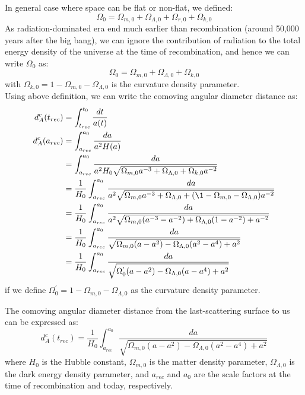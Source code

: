 \bigskip \noindent
\begin{foundation}
    In general case where space can be flat or non-flat, we defined:
    \[
        \Omega_0 = \Omega_{m,0} + \Omega_{\Lambda,0} + \Omega_{r,0} + \Omega_{k,0}
    \]
    As radiation-dominated era end much earlier than recombination (around 50,000 years after the big bang), we can ignore the contribution of radiation to the total energy density of the universe at the time of recombination, and hence we can write $\Omega_0$ as:
    \[
        \Omega_0 = \Omega_{m,0} + \Omega_{\Lambda,0} + \Omega_{k,0}
    \]
    with $\Omega_{k,0} = 1 - \Omega_{m,0} - \Omega_{\Lambda,0}$ is the curvature density parameter. \\

    Using above definition, we can write the comoving angular diameter distance as:
    \begin{align*}
        d_A^c(t_{rec}) &= \int_{t_{rec}}^{t_0} \frac{dt}{a(t)} \\
        d_A^c(a_{rec}) &= \int_{a_{rec}}^{a_0} \frac{da}{a^2 H(a)} \\
         &= \int_{a_{rec}}^{a_0} \frac{da}{a^2 H_0 \sqrt{\Omega_{m,0} a^{-3} + \Omega_{\Lambda,0} + \Omega_{k,0} a^{-2}}} \\
         &= \frac{1}{H_0} \int_{a_{rec}}^{a_0} \frac{da}{a^2 \sqrt{\Omega_{m,0} a^{-3} + \Omega_{\Lambda,0} + (\1 - \Omega_{m,0} - \Omega_{\Lambda,0}) a^{-2}}} \\
         &= \frac{1}{H_0} \int_{a_{rec}}^{a_0} \frac{da}{a^2 \sqrt{\Omega_{m,0} (a^{-3} - a^{-2}) + \Omega_{\Lambda,0} (1 - a^{-2}) + a^{-2}}} \\
         &= \frac{1}{H_0} \int_{a_{rec}}^{a_0} \frac{da}{\sqrt{\Omega_{m,0} (a - a^2) - \Omega_{\Lambda,0} (a^2 - a^4) + a^2}} \\
         &= \frac{1}{H_0} \int_{a_{rec}}^{a_0} \frac{da}{\sqrt{\Omega_{0}^{'}(a - a^2) - \Omega_{\Lambda,0} (a - a^4) + a^2}}
    \end{align*}
    if we define $\Omega_{0}^{'} = 1 - \Omega_{m,0} - \Omega_{\Lambda,0}$ as the curvature density parameter.
\end{foundation}

\bigskip \noindent
\begin{theory}
    The comoving angular diameter distance from the last-scattering surface to us can be expressed as:
    \[
        d_A^c(t_{rec}) = \frac{1}{H_0} \int_{a_{rec}}^{a_0} \frac{da}{\sqrt{\Omega_{m,0} (a - a^2) - \Omega_{\Lambda,0} (a^2 - a^4) + a^2}}
    \]
    where $H_0$ is the Hubble constant, $\Omega_{m,0}$ is the matter density parameter, $\Omega_{\Lambda,0}$ is the dark energy density parameter, and $a_{rec}$ and $a_0$ are the scale factors at the time of recombination and today, respectively.
\end{theory}

